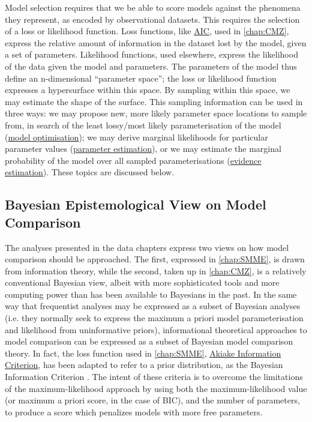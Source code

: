 Model selection requires that we be able to score models against the phenomena they represent, as encoded by observational datasets. This requires the selection of a loss or likelihood function. Loss functions, like \hyperref[AIC]{AIC}, used in \autoref{chap:CMZ}, express the relative amount of information in the dataset lost by the model, given a set of parameters. Likelihood functions, used elsewhere, express the likelihood of the data given the model and parameters. The parameters of the model thus define an n-dimensional ``parameter space''; the loss or likelihood function expresses a hypersurface within this space. By sampling within this space, we may estimate the shape of the surface. This sampling information can be used in three ways: we may propose new, more likely parameter space locations to sample from, in search of the least lossy/most likely parameterisation of the model (\hyperref[opt]{model optimisation}); we may derive marginal likelihoods for particular parameter values (\hyperref[est]{parameter estimation}), or we may estimate the marginal probability of the model over all sampled parameterisations (\hyperref[evi]{evidence estimation}). These topics are discussed below.

\subsection{Bayesian Epistemological View on Model Comparison}
\label{ssec:BayesEpistemology}
The analyses presented in the data chapters express two views on how model comparison should be approached. The first, expressed in \autoref{chap:SMME}, is drawn from information theory, while the second, taken up in \autoref{chap:CMZ}, is a relatively conventional Bayesian view, albeit with more sophisticated tools and more computing power than has been available to Bayesians in the past. In the same way that frequentist analyses may be expressed as a subset of Bayesian analyses (i.e. they normally seek to express the maximum a priori model parameterisation and likelihood from uninformative priors), informational theoretical approaches to model comparison can be expressed as a subset of Bayesian model comparison theory. In fact, the loss function used in \autoref{chap:SMME}, \hyperref[AIC]{Akiake Information Criterion}, has been adapted to refer to a prior distribution, as the Bayesian Information Criterion \cite{Posada2004}. The intent of these criteria is to overcome the limitations of the maximum-likelihood approach by using both the maximum-likelihood value (or maximum a priori score, in the case of BIC), and the number of parameters, to produce a score which penalizes models with more free parameters.

